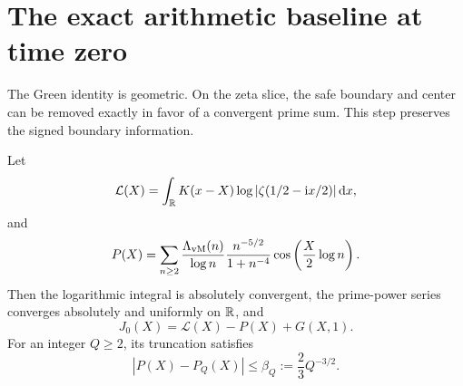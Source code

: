 \section{The exact arithmetic baseline at time zero}\label{sec:prime}

The Green identity is geometric. On the zeta slice, the safe boundary
and center can be removed exactly in favor of a convergent prime sum.
This step preserves the signed boundary information.

\begin{proposition}\label{prop:prime}
Let
\[
 \mathcal L(X)=\int_\mathbb R K(x-X)\log|\zeta(1/2-\mathrm i x/2)|\,\mathrm d x,
\]
and
\begin{equation}\label{eq:P}
 P(X)=\sum_{n\ge2}\frac{\Lambda_{\rm vM}(n)}{\log n}
       \frac{n^{-5/2}}{1+n^{-4}}
       \cos\left(\frac X2\log n\right).
\end{equation}
Then the logarithmic integral is absolutely convergent, the prime-power
series converges absolutely and uniformly on \(\mathbb R\), and
\begin{equation}\label{eq:prime}
 J_0(X)=\mathcal L(X)-P(X)+G(X,1).
\end{equation}
For an integer \(Q\ge2\), its truncation satisfies
\begin{equation}\label{eq:prime-tail}
 |P(X)-P_Q(X)|\le\beta_Q:=\frac23Q^{-3/2}.
\end{equation}
\end{proposition}
